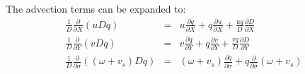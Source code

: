 The advection terms can be expanded to:
\begin{eqnarray}
\frac{1}{D}\frac{\partial }{\partial X} \left(uDq\right) &=&
 u\frac{\partial q}{\partial X} + q\frac{\partial u}{\partial X} + \frac{uq}{D} \frac{\partial D}{\partial X} \\
\frac{1}{D}\frac{\partial }{\partial Y} \left(vDq\right) &=&
 v\frac{\partial q}{\partial Y} + q\frac{\partial v}{\partial Y} + \frac{vq}{D} \frac{\partial D}{\partial Y} \\
\frac{1}{D}\frac{\partial }{\partial \sigma} \left(\left( \omega + v_s \right)Dq\right) &=&
 \left( \omega + v_s \right)\frac{\partial q}{\partial \sigma} + q\frac{\partial }{\partial \sigma}\left( \omega + v_s \right)
\end{eqnarray}



